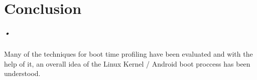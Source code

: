 

\chapter{Conclusion}
\label{conclusion}
\paragraph*{•}

\hspace{8mm} 

\noindent Many of the techniques for boot time profiling have been evaluated and with the
help of it, an overall idea of the Linux Kernel / Android boot proccess has been understood.

